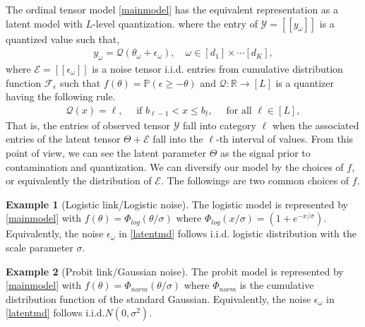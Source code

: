 \documentclass{article}
\theoremstyle{plain}
\theoremstyle{definition}
\newtheorem{example}{Example}
\begin{document}
The ordinal tensor model \eqref{mainmodel} has the equivalent representation as a latent model with $L$-level quantization. \citep{davenport20141,lan2014matrix,bhaskar20151,cai2013max} where the entry of
$\mathcal{Y} = [\![ y_\omega]\!]$ is a quantized value such that,
\begin{equation}
    \label{latentmd}
\begin{aligned}
    y_\omega = \mathcal{Q}(\theta_\omega+\epsilon_\omega),\quad \omega\in [d_1]\times\cdots[d_K],
\end{aligned}
\end{equation}
where $\mathcal{E} = [\![\epsilon_\omega]\!]$ is a noise tensor i.i.d. entries from cumulative distribution function $\mathcal{F}_\epsilon$ such that $f(\theta) = \mathbb{P}(\epsilon \geq -\theta)$ and  $\mathcal{Q}:\mathbb{R}\rightarrow [L]$ is a quantizer having the following rule.
\begin{equation}
    \label{qfunction}
    \begin{aligned}
        \mathcal{Q}(x) = \ell,\quad \text{ if } b_{\ell-1}< x \leq b_{\ell},\quad \text{ for all } \ell\in [L],
    \end{aligned}
\end{equation}
That is, the entries of observed tensor $\mathcal{Y}$ fall into category $\ell$ when the associated entries of the latent tensor $\Theta+\mathcal{E}$ fall into the $\ell$-th interval of values. From this point of view, we can see the latent parameter $\Theta$ as the signal prior to contamination and quantization.
We can diversify our model by the choices of $f$, or equivalently the distribution of $\mathcal{E}$.
The followings are two common choices of $f$.

\begin{example}[Logistic link/Logistic noise] The logistic model is represented by \eqref{mainmodel} with $f(\theta) = \Phi_{log}(\theta/\sigma)$  where $\Phi_{log}(x/\sigma) = (1+e^{-x/\sigma})$. Equivalently, the noise $\epsilon_\omega$ in \eqref{latentmd} follows i.i.d. logistic distribution with the scale parameter $\sigma.$
\end{example}

\begin{example}[Probit link/Gaussian noise] The probit model is represented by \eqref{mainmodel} with $f(\theta) = \Phi_{norm}(\theta/\sigma)
$ where $\Phi_{norm}$ is the cumulative distribution function of the standard Gaussian. Equivalently, the noise $\epsilon_\omega$ in \eqref{latentmd} follows i.i.d.$N(0,\sigma^2)$.
\end{example}
\end{document}
